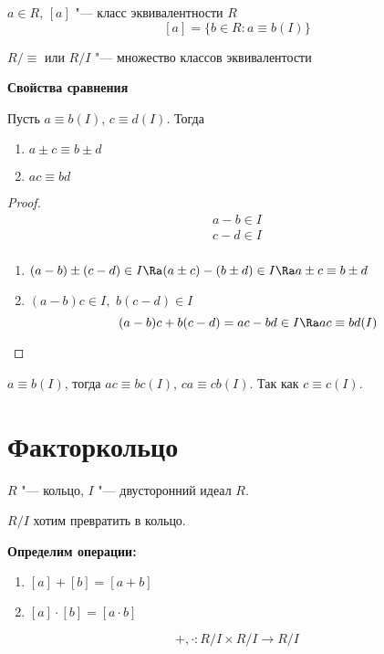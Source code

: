 ﻿

\begin{Def}
	$a \in R$,
	$[a]$ "--- класс эквивалентности $R$
	\[ [a] = \{b \in R \colon a \equiv b (I) \} \]
	\begin{center}
		$R/ \equiv$ или $R/I$ "--- множество классов эквивалентости
	\end{center}
\end{Def}

\textbf{Свойства сравнения}

Пусть $a \equiv b (I)$, $c \equiv d (I)$. Тогда
\begin{enumerate}
	\item $a \pm c \equiv b \pm d$
	\item $ac \equiv bd$
\end{enumerate}
	
\begin{proof}
	\begin{gather*}
		a - b \in I \\
		c - d \in I \\
	\end{gather*}
	\begin{enumerate}
		\item $(a - b) \pm (c - d) \in I \Ra
			(a \pm c) - (b \pm d) \in I \Ra a \pm c \equiv b \pm d$
		\item $(a - b) c \in I,$
		$b (c - d) \in I$
		\[(a - b) c + b (c - d) = ac - bd \in I \Ra ac \equiv bd (I)\]
	\end{enumerate}
\end{proof}
	
\begin{conseq}	
	$a \equiv b (I)$, тогда
	$ac \equiv bc (I)$, $ca \equiv cb (I)$.
	Так как $c \equiv c (I)$.
\end{conseq}

\section{Факторкольцо}

$R$ "--- кольцо, $I$ "--- двусторонний идеал $R$.

$R / I$ хотим превратить в кольцо.

\textbf{Определим операции:}
\begin{enumerate}
	\item $[a] + [b] = [a + b]$
	\item $[a] \cdot [b] = [a \cdot b]$
\end{enumerate}	
\[+, \cdot \colon R/I \times R/I \to R/I\]
	
